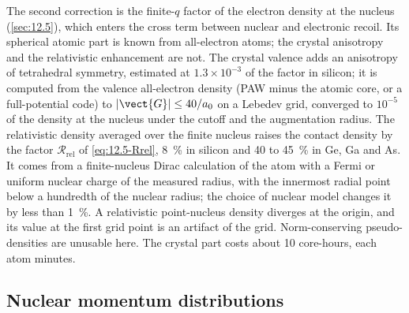 The second correction is the finite-$q$ factor of the electron density at the nucleus (\cref{sec:12.5}), which enters the cross term between nuclear and electronic recoil. Its spherical atomic part is known from all-electron atoms; the crystal anisotropy and the relativistic enhancement are not. The crystal valence adds an anisotropy of tetrahedral symmetry, estimated at $1.3\times10^{-3}$ of the factor in silicon; it is computed from the valence all-electron density (PAW minus the atomic core, or a full-potential code) to $|\vect{G}| \le 40/a_0$ on a Lebedev grid, converged to $10^{-5}$ of the density at the nucleus under the cutoff and the augmentation radius. The relativistic density averaged over the finite nucleus raises the contact density by the factor $\mathcal{R}_{\mathrm{rel}}$ of \cref{eq:12.5-Rrel}, \SI{8}{\percent} in silicon and 40 to \SI{45}{\percent} in Ge, Ga and As. It comes from a finite-nucleus Dirac calculation of the atom with a Fermi or uniform nuclear charge of the measured radius, with the innermost radial point below a hundredth of the nuclear radius; the choice of nuclear model changes it by less than \SI{1}{\percent}. A relativistic point-nucleus density diverges at the origin, and its value at the first grid point is an artifact of the grid. Norm-conserving pseudo-densities are unusable here. The crystal part costs about 10 core-hours, each atom minutes.

\subsection{Nuclear momentum distributions}

